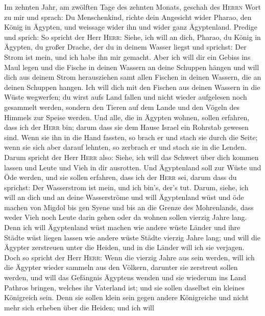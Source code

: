  Im zehnten Jahr, am zwölften Tage des zehnten Monats,
geschah des \textsc{Herrn} Wort zu mir und sprach:  Du
Menschenkind, richte dein Angesicht wider Pharao, den König in Ägypten,
und weissage wider ihn und wider ganz Ägyptenland. 
Predige und sprich: So spricht der Herr \textsc{Herr}: Siehe, ich will
an dich, Pharao, du König in Ägypten, du großer Drache, der du in deinem
Wasser liegst und sprichst: Der Strom ist mein, und ich habe ihn mir
gemacht.  Aber ich will dir ein Gebiss ins Maul legen und
die Fische in deinen Wassern an deine Schuppen hängen und will dich aus
deinem Strom herausziehen samt allen Fischen in deinen Wassern, die an
deinen Schuppen hangen.  Ich will dich mit den Fischen aus
deinen Wassern in die Wüste wegwerfen; du wirst aufs Land fallen und
nicht wieder aufgelesen noch gesammelt werden, sondern den Tieren auf
dem Lande und den Vögeln des Himmels zur Speise werden. 
Und alle, die in Ägypten wohnen, sollen erfahren, dass ich der
\textsc{Herr} bin; darum dass sie dem Hause Israel ein Rohrstab gewesen
sind.  Wenn sie ihn in die Hand fassten, so brach er und
stach sie durch die Seite; wenn sie sich aber darauf lehnten, so
zerbrach er und stach sie in die Lenden.  Darum spricht
der Herr \textsc{Herr} also: Siehe, ich will das Schwert über dich
kommen lassen und Leute und Vieh in dir ausrotten.  Und
Ägyptenland soll zur Wüste und Öde werden, und sie sollen erfahren, dass
ich der \textsc{Herr} sei, darum dass du sprichst: Der Wasserstrom ist
mein, und ich bin's, der's tut.  Darum, siehe, ich will
an dich und an deine Wasserströme und will Ägyptenland wüst und öde
machen von Migdol bis gen Syene und bis an die Grenze des Mohrenlands,
 dass weder Vieh noch Leute darin gehen oder da wohnen
sollen vierzig Jahre lang.  Denn ich will Ägyptenland
wüst machen wie andere wüste Länder und ihre Städte wüst liegen lassen
wie andere wüste Städte vierzig Jahre lang; und will die Ägypter
zerstreuen unter die Heiden, und in die Länder will ich sie verjagen.
 Doch so spricht der Herr \textsc{Herr}: Wenn die vierzig
Jahre aus sein werden, will ich die Ägypter wieder sammeln aus den
Völkern, darunter sie zerstreut sollen werden,  und will
das Gefängnis Ägyptens wenden und sie wiederum ins Land Pathros bringen,
welches ihr Vaterland ist; und sie sollen daselbst ein kleines
Königreich sein.  Denn sie sollen klein sein gegen andere
Königreiche und nicht mehr sich erheben über die Heiden; und ich will
